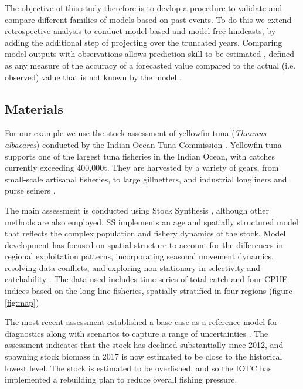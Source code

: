 \documentclass[12pt,halfline,a4paper,nonumbib]{ouparticle}
\begin{document}
The objective of this study therefore is to devlop a procedure to validate and compare different families of models based on past events. To do this we extend retrospective analysis to conduct model-based and model-free hindcasts, by adding the additional step of projecting over the truncated years. Comparing model outputs with observations allows prediction skill to be estimated \parencite{kell2016xval}, defined as any measure of the accuracy of a forecasted value compared to the actual (i.e. observed) value that is not known by the model \parencite{glickman2000glossary}. 

\subsection{Materials}

For our example we use the stock assessment of yellowfin tuna (\textit{Thunnus albacares}) conducted by the Indian Ocean Tuna Commission \parencite{IOTWPTT21}. Yellowfin tuna supports one of the largest tuna fisheries in the Indian Ocean, with catches currently exceeding 400,000t. They are harvested by a variety of gears, from small-scale artisanal fisheries, to large gillnetters, and industrial longliners and purse seiners \parencite{fiorellato2019tt}.

The main assessment is conducted using Stock Synthesis \parencite[SS,][]{methot2013stock}, although other methods are also employed. SS implements an age and spatially structured model that reflects the complex population and fishery dynamics of the stock. Model development has focused on spatial structure to account for the differences in regional exploitation patterns, incorporating seasonal movement dynamics, resolving data conflicts, and exploring non-stationary in selectivity and catchability \parencite{urtizberea2018yft}. The data used includes time series of total catch and four CPUE indices based on the long-line fisheries, spatially stratified in four regions (figure \ref{fig:map})
 
The most recent assessment established a base case as a reference model for diagnostics along with scenarios to capture a range of uncertainties \parencite{fu2018yft}. The assessment indicates that the stock  has declined substantially since 2012, and spawning stock biomass in 2017 is now estimated to be close to the historical lowest level. The stock is estimated to be overfished, and so the IOTC has implemented a rebuilding plan to reduce overall fishing pressure.  
\end{document}
